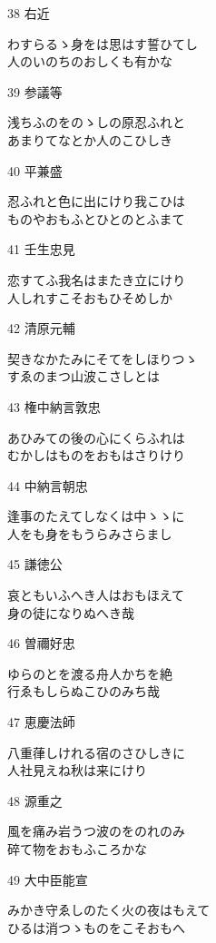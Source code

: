 \begin{shiika}
\end{shiika}38 右近         \begin{shiika}わすらるゝ身をは思はす誓ひてし\\人のいのちのおしくも有かな 
\end{shiika}39 参議等       \begin{shiika}浅ちふのをのゝしの原忍ふれと\\あまりてなとか人のこひしき 
\end{shiika}40 平兼盛       \begin{shiika}忍ふれと色に出にけり我こひは\\ものやおもふとひとのとふまて 
\end{shiika}41 壬生忠見     \begin{shiika}恋すてふ我名はまたき立にけり\\人しれすこそおもひそめしか 
\end{shiika}42 清原元輔     \begin{shiika}契きなかたみにそてをしほりつゝ\\すゑのまつ山波こさしとは 
\end{shiika}43 権中納言敦忠 \begin{shiika}あひみての後の心にくらふれは\\むかしはものをおもはさりけり 
\end{shiika}44 中納言朝忠   \begin{shiika}逢事のたえてしなくは中ゝゝに\\人をも身をもうらみさらまし 
\end{shiika}45 謙徳公       \begin{shiika}哀ともいふへき人はおもほえて\\身の徒になりぬへき哉 
\end{shiika}46 曽禰好忠     \begin{shiika}ゆらのとを渡る舟人かちを絶\\行ゑもしらぬこひのみち哉 
\end{shiika}47 恵慶法師     \begin{shiika}八重葎しけれる宿のさひしきに\\人社見えね秋は来にけり 
\end{shiika}48 源重之       \begin{shiika}風を痛み岩うつ波のをのれのみ\\碎て物をおもふころかな 
\end{shiika}49 大中臣能宣   \begin{shiika}みかき守ゑしのたく火の夜はもえて\\ひるは消つゝものをこそおもへ

\end{shiika}
